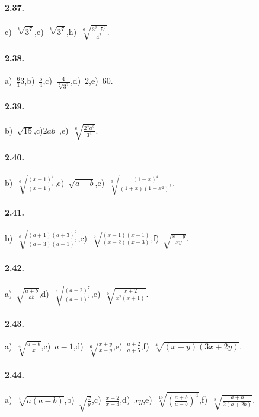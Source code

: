 \paragraph{2.37.}
c)~$\sqrt[6]{3^7}$,\quad e)~$\sqrt[6]{3^7}$,\quad h)~$\sqrt[6]{\frac{3^2\cdot 5^3}{4^2}}$.

\paragraph{2.38.}
a)~$\frac 6 13$,\quad b)~$\frac 5 4$,\quad c)~$\frac{4}{\sqrt[3]{3^2}}$,\quad d)~$2$,\quad e)~$60$.

\paragraph{2.39.}
b)~$\sqrt{15}$,\quad c)$2ab$~,\quad e)~$\sqrt[6]{\frac{2^3a^2}{3^4}}$.

\paragraph{2.40.}
b)~$\sqrt[6]{\frac{(x+1)^4}{(x-1)^3}}$,\quad c)~$\sqrt{a-b}$,\quad e)~$\sqrt[6]{\frac{(1-x)^4}{(1+x)(1+x^2)^2}}$.

\paragraph{2.41.}
b)~$\sqrt[6]{\frac{(a+1)(a+3)^2}{(a-3)(a-1)^2}}$,\quad c)~$\sqrt[6]{\frac{(x-1)(x+1)}{(x-2)(x+3)}}$,\quad f)~$\sqrt{\frac{x-y}{xy}}$.

\paragraph{2.42.}
a)~$\sqrt{\frac{a+b}{ab}}$,\quad d)~$\sqrt[6]{\frac{(a+2)^7}{(a-1)^7}}$,\quad e)~$\sqrt[6]{\frac{x+2}{x^2(x+1)}}$.

\paragraph{2.43.}
a)~$\sqrt[4]{\frac{a+b} x}$,\quad c)~$a-1$,\quad d)~$\sqrt[6]{\frac{x+y}{x-y}}$,\quad e)~$\frac{a+2}{a+5}$,\quad f)~$\sqrt[4]{(x+y)(3x+2y)}$.

\paragraph{2.44.}
a)~$\sqrt[4]{a(a-b)}$,\quad b)~$\sqrt{\frac{x}{y}}$,\quad c)~$\frac{x-2}{x+3}$,\quad d)~$xy$,\quad e)~$\sqrt[15]{\left(\frac{a+b}{a-b}\right)^4}$,\quad f)~$\sqrt[8]{\frac{a+b}{2(a+2b)}}$.

